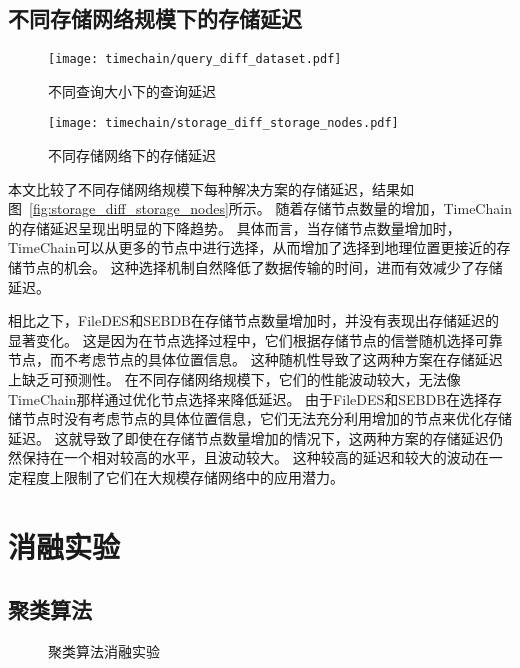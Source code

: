 \subsection{不同存储网络规模下的存储延迟}
\begin{figure}[t]
    \centering
	\begin{minipage}{0.48\linewidth}
        \centering
        \texttt{[image: timechain/query\_diff\_dataset.pdf]}
        \caption{不同查询大小下的查询延迟}
        \label{fig:query_diff_dataset}
	\end{minipage}
	\quad
	\begin{minipage}{0.48\linewidth}
        \centering
        \texttt{[image: timechain/storage\_diff\_storage\_nodes.pdf]}
        \caption{不同存储网络下的存储延迟}
        \label{fig:storage_diff_storage_nodes}
    \end{minipage}
\end{figure}

本文比较了不同存储网络规模下每种解决方案的存储延迟，结果如图~\autoref{fig:storage_diff_storage_nodes}所示。
随着存储节点数量的增加，TimeChain的存储延迟呈现出明显的下降趋势。
具体而言，当存储节点数量增加时，TimeChain可以从更多的节点中进行选择，从而增加了选择到地理位置更接近的存储节点的机会。
这种选择机制自然降低了数据传输的时间，进而有效减少了存储延迟。

相比之下，FileDES和SEBDB在存储节点数量增加时，并没有表现出存储延迟的显著变化。
这是因为在节点选择过程中，它们根据存储节点的信誉随机选择可靠节点，而不考虑节点的具体位置信息。
这种随机性导致了这两种方案在存储延迟上缺乏可预测性。
在不同存储网络规模下，它们的性能波动较大，无法像TimeChain那样通过优化节点选择来降低延迟。
由于FileDES和SEBDB在选择存储节点时没有考虑节点的具体位置信息，它们无法充分利用增加的节点来优化存储延迟。
这就导致了即使在存储节点数量增加的情况下，这两种方案的存储延迟仍然保持在一个相对较高的水平，且波动较大。
这种较高的延迟和较大的波动在一定程度上限制了它们在大规模存储网络中的应用潜力。

\section{消融实验}
\subsection{聚类算法}
\begin{figure*}[t]
    \centering
	\begin{minipage}{1\linewidth}
        \quad
        \caption{聚类算法消融实验} 
    \end{minipage}
\end{figure*}

